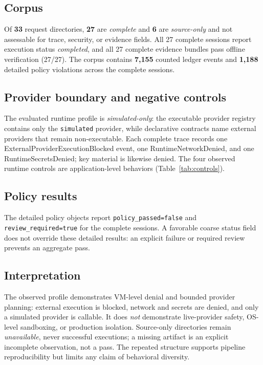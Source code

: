 \documentclass[conference]{IEEEtran}
\newcommand{\code}[1]{\texttt{\small #1}}
\begin{document}
\subsection{Corpus}
Of \textbf{33} request directories, \textbf{27} are \emph{complete} and \textbf{6} are
\emph{source-only} and not assessable for trace, security, or evidence fields. All 27
complete sessions report execution status \emph{completed}, and all 27 complete evidence
bundles pass offline verification (27/27). The corpus contains \textbf{7{,}155} counted
ledger events and \textbf{1{,}188} detailed policy violations across the complete sessions.

\subsection{Provider boundary and negative controls}
The evaluated runtime profile is \emph{simulated-only}: the executable provider registry
contains only the \code{simulated} provider, while declarative contracts name external
providers that remain non-executable. Each complete trace records one
\textsf{ExternalProviderExecutionBlocked} event, one \textsf{RuntimeNetworkDenied}, and one
\textsf{RuntimeSecretsDenied}; key material is likewise denied. The four observed runtime
controls are application-level behaviors (Table~\ref{tab:controls}).

\subsection{Policy results}
The detailed policy objects report \code{policy\_passed=false} and
\code{review\_required=true} for the complete sessions. A favorable coarse status field
does not override these detailed results: an explicit failure or required review prevents
an aggregate pass.

\subsection{Interpretation}
The observed profile demonstrates VM-level denial and bounded provider planning: external
execution is blocked, network and secrets are denied, and only a simulated provider is
callable. It does \emph{not} demonstrate live-provider safety, OS-level sandboxing, or
production isolation. Source-only directories remain \emph{unavailable}, never successful
executions; a missing artifact is an explicit incomplete observation, not a pass. The
repeated structure supports pipeline reproducibility but limits any claim of behavioral
diversity.
\end{document}
